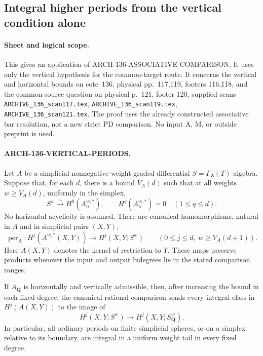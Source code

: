 \subsection{Integral higher periods from the vertical condition alone}
\label{arch136:vertical-periods}

\paragraph{Sheet and logical scope.}
This gives an application of
ARCH-136-ASSOCIATIVE-\allowbreak COMPARISON.
It uses only the vertical hypothesis for the common-target route.
It concerns the vertical and horizontal bounds on cote~136,
physical pp.~117,119, footers 116,118, and the common-source
question on physical p.~121, footer 120, supplied scans
\texttt{ARCHIVE\_136\_scan117.tex},
\texttt{ARCHIVE\_136\_scan119.tex},
\texttt{ARCHIVE\_136\_scan121.tex}.
The proof uses the already constructed associative bar resolution,
not a new strict PD comparison. No input A, M, or outside
preprint is used.

\paragraph{ARCH-136-VERTICAL-PERIODS.}
Let \(A\) be a simplicial nonnegative weight-graded differential
\(S=\Gamma_{\mathbf Z}(T)\)-algebra. Suppose that, for each \(d\),
there is a bound \(V_A(d)\) such that at all weights
\(w\geq V_A(d)\), uniformly in the simplex,
\[
 S^w\xrightarrow{\sim}H^0(A_n^{w,*}),\qquad
                  H^q(A_n^{w,*})=0\quad(1\leq q\leq d).
 \tag{136.VP1}
\]
No horizontal acyclicity is assumed. There are canonical
homomorphisms, natural in \(A\) and in simplicial pairs \((X,Y)\),
\[
 \operatorname{per}_A:
 H^j(A^{w,*}(X,Y))
       \longrightarrow H^j(X,Y;S^w)
 \qquad (0\leq j\leq d,\ w\geq V_A(d+1)).
 \tag{136.VP2}
\]
Here \(A(X,Y)\) denotes the kernel of restriction to \(Y\).
These maps preserve products whenever the input and output
bidegrees lie in the stated comparison ranges.

If \(A_{\mathbf Q}\) is horizontally and vertically admissible,
then, after increasing the bound in each fixed degree,
the canonical rational comparison sends every integral
class in \(H^j(A(X,Y))\) to the image of
\[
                 H^j(X,Y;S^w)\longrightarrow
                    H^j(X,Y;S_{\mathbf Q}^w).
 \tag{136.VP3}
\]
In particular, all ordinary periods on finite simplicial spheres,
or on a simplex relative to its boundary, are integral in a
uniform weight tail in every fixed degree.

